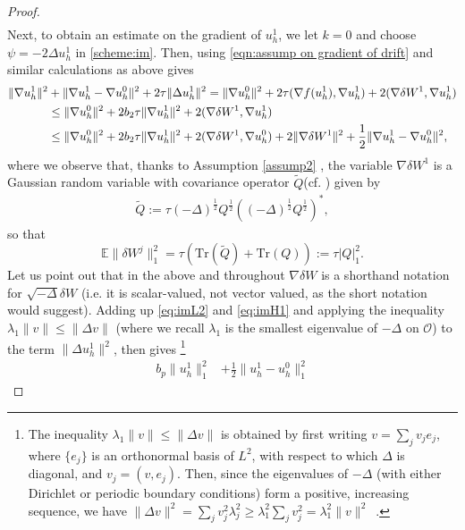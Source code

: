 \documentclass[reqno, 11pt]{amsart}
\theoremstyle{plain}
\theoremstyle{definition}
\theoremstyle{remark}
\numberwithin{equation}{section}
\numberwithin{theorem}{section}
\begin{document}
{\begin{proof}
\begin{align}
\end{align}
{Next, to obtain an estimate on the gradient of $u_h^1$,}
we let $k=0$ and choose $\psi=-2\Delta u_h^1$ in \eqref{scheme:im}. %
 Then, using \eqref{eqn:assump on gradient of drift} and similar calculations as above gives
\begin{align}\label{eq:imH1}
\|\nabla u_h^1\|^2&+\| \nabla u_h^1-\nabla u_h^0\|^2+2\tau\|\Delta u_h^1\|^2=\|\nabla u_h^0\|^2+2\tau (\nabla f(u_h^1), \nabla u_h^1)+2(\nabla\delta W^1, \nabla u_h^1)\notag\\
&\leq \|\nabla u_h^0\|^2+2b_2\tau\|\nabla u_h^1\|^2+2(\nabla\delta W^1, \nabla u_h^1)\notag\\
&\leq \|\nabla u_h^0\|^2+2b_2\tau\|\nabla u_h^1\|^2+2(\nabla \delta W^1, \nabla u_h^0)+2\|\nabla\delta W^1\|^2+\frac{1}{2}\|\nabla u_h^1-\nabla u_h^0\|^2, 
\end{align}
where we observe that,  thanks to Assumption \ref{assump2} , the variable   $\nabla \delta W^1$ 
is a Gaussian random variable with covariance  operator $\tilde Q$(cf. \cite{KovacsLL15}) given by
\begin{align}\label{eq:tildeQ}
\tilde{Q}:=\tau (-\Delta)^{\frac{1}{2}}Q^{\frac{1}{2}} ((-\Delta)^{\frac{1}{2}}Q^{\frac{1}{2}})^*,
\end{align}
so that 
$$\mathbb{E}\|\delta W^j\|_1^2=\tau (\text{Tr}(\tilde{Q})+\text{Tr}(Q)):=\tau |Q|_1^2.
$$
Let us point out that in the above and throughout $\nabla \delta W$ is a shorthand notation for $\sqrt{-\Delta} \delta W$ (i.e. it is scalar-valued, not vector valued, as the short notation would suggest). 
Adding up \eqref{eq:imL2} and \eqref{eq:imH1} and applying the inequality $\lambda_1\|v\|\leq \|\Delta v\|$ (where we recall $\lambda_1$ is the smallest eigenvalue of $-\Delta$ on $\mathcal{O}$) to the term $\|\Delta u_h^1\|^2$, then gives \footnote{The inequality $\lambda_1 \|v\|\leq \|\Delta v\|$ is obtained by first writing $v=\sum_jv_j e_j$, where $\{e_j\}$ is an orthonormal basis of $L^2$, with respect to which $\Delta$ is diagonal, and $v_j = (v, e_j)$. Then, since the eigenvalues of $-\Delta$ (with either Dirichlet or periodic boundary conditions) form a positive, increasing sequence, we have  $\|\Delta v\|^2 = \sum_j v_j^2 \lambda_j^2 \geq \lambda_1^2 \sum_j v_j^2 =\lambda_1^2\|v\|^2$ \,.}
\begin{align}
b_p\|u_h^1\|_1^2&+\frac{1}{2}\| u_h^1- u_h^0\|_1^2

\end{align}
\end{proof}}
\end{document}

